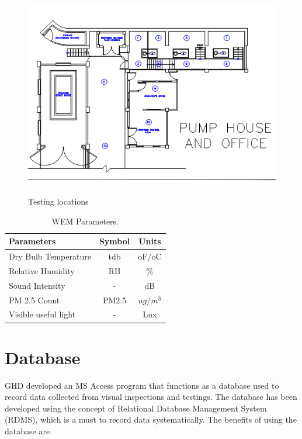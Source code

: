 \begin{figure} [!htb]
	\includegraphics[scale=0.75]{figures/ch02_wem01} \\
	\caption{Testing locations}
	\label{ch02_wem01} 
\end{figure}

\begin{table}[h]
	\caption{WEM Parameters.}
	\label{ch02_tbl_wemparameter}
	{\footnotesize
\begin{tabular}{l|l|l}
	\hline
	Parameters & \multicolumn{1}{c|}{Symbol} & \multicolumn{1}{c}{Units} \\ 
	\hline
	Dry Bulb Temperature & \multicolumn{1}{c|}{tdb} & \multicolumn{1}{c}{oF/oC} \\ 
	Relative Humidity & \multicolumn{1}{c|}{RH} & \multicolumn{1}{c}{\%} \\ 
	Sound Intensity & \multicolumn{1}{c|}{-} & \multicolumn{1}{c}{dB} \\ 
	PM 2.5 Count & \multicolumn{1}{c|}{PM2.5} & \multicolumn{1}{c}{$ug/m^3$} \\ 
	Visible useful light & \multicolumn{1}{c|}{-} & \multicolumn{1}{c}{Lux} \\ 
	\hline
\end{tabular}	
	}
\end{table}

\section{Database}
\label{24}
GHD developed an MS Access program that functions as a database used to record data collected from visual inspections and testings. The database has been developed using the concept of Relational Database Management System (RDMS), which is a must to record data systematically. The benefits of using the database are

